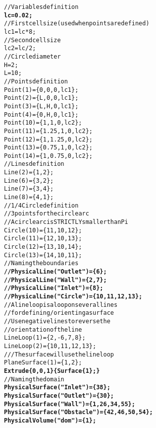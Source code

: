 \begin{alltt}
// Variables definition
{\bf{lc = 0.02;}}
// First cell size (used when points are defined)
lc1 = lc * 8;
// Second cell size
lc2 = lc / 2;
// Circle diameter
H=2;
L=10;
// Points definition 
Point(1)=\{0,0,0,lc1\};
Point(2) = \{L,0,0,lc1\};
Point(3) = \{L,H,0,lc1\};
Point(4) = \{0,H,0,lc1\};
Point(10)= \{1,1,0,lc2\};
Point(11)=\{1.25,1,0,lc2\}; 
Point(12)=\{1,1.25,0,lc2\}; 
Point(13)=\{0.75,1,0,lc2\}; 
Point(14)=\{1,0.75,0,lc2\};
// Lines definition
Line(2) = \{1,2\};
Line(6) = \{3,2\};
Line(7) = \{3,4\};
Line(8) = \{4,1\};
// 1/4 Circle definition
// 3 points for the circle arc
// A circle arc is STRICTLY smaller than Pi
Circle(10)=\{11,10,12\}; 
Circle(11)=\{12,10,13\}; 
Circle(12)=\{13,10,14\}; 
Circle(13)=\{14,10,11\};
// Naming the boundaries
{\bf{//Physical Line("Outlet") = \{6\};}}
{\bf{//Physical Line("Wall") = \{2,7\};}}
{\bf{//Physical Line("Inlet") = \{8\};}}
{\bf{//Physical Line("Circle") = \{10,11,12,13\};}}
// A lineloop is a loop on several lines
// for defining/orienting a surface
// Use negative lines to reverse the
// orientation of the line
Line Loop(1) = \{2,-6,7,8\};
Line Loop(2) = \{10,11,12,13\};
/// The surface will use the lineloop
Plane Surface(1) = \{1,2\};
{\bf{Extrude \{0,0,1\} \{ Surface\{1\} ; \}}}
// Naming the domain
{\bf{Physical Surface("Inlet") = \{38\};}}
{\bf{Physical Surface("Outlet") = \{30\};}}
{\bf{Physical Surface("Wall") = \{1,26,34,55\};}}
{\bf{Physical Surface("Obstacle") = \{42,46,50,54\};}}
{\bf{Physical Volume("dom") = \{1\};}}
\end{alltt}
